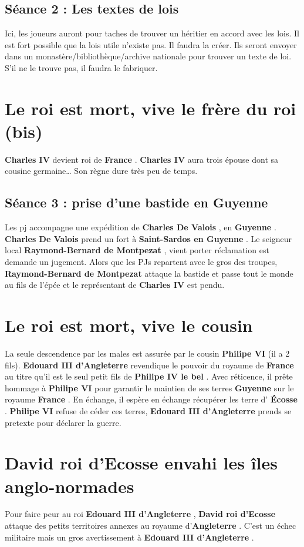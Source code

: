 \documentclass[oneside,12pt]{book}
\newcommand{\Guyenne}{\textbf{Guyenne} }%
\newcommand{\France}{\textbf{France} }
\newcommand{\Angleterre}{\textbf{Angleterre} }
\newcommand{\Ecosse}{\textbf{Écosse} }
\newcommand{\SaintSardos}{\textbf{Saint-Sardos en Guyenne} }
\newcommand{\PhilipeIVLeBel}{\textbf{Philipe IV le bel} }%
\newcommand{\CharlesIV}{\textbf{Charles IV} }%
\newcommand{\CharlesDeValois}{\textbf{Charles De Valois} }%
\newcommand{\PhilipeVI}{\textbf{Philipe VI} }%
\newcommand{\EdouardIII}{\textbf{Edouard III d'Angleterre} }%
\newcommand{\ducGuyenne}{\textbf{Raymond-Bernard de Montpezat} }
\newcommand{\RoiEcosse}{\textbf{David roi d'Ecosse} }
\begin{document}
\begin{flushleft}
\subsection{Séance 2 : Les textes de lois}
Ici, les joueurs auront pour taches de trouver un héritier en accord avec les lois. Il est fort possible que la lois utile n'existe pas. 
Il faudra la créer. Ils seront envoyer dans un monastère/bibliothèque/archive nationale pour trouver un texte de loi. 
S'il ne le trouve pas, il faudra le fabriquer.


\section{Le roi est mort, vive le frère du roi (bis)}
\CharlesIV devient roi de \France.
\CharlesIV aura trois épouse dont sa cousine germaine…
Son règne dure très peu de temps. 

\subsection{Séance 3 : prise d'une bastide en \Guyenne}
Les pj accompagne une expédition de \CharlesDeValois, en \Guyenne. \CharlesDeValois prend un fort à \SaintSardos.
Le seigneur local \ducGuyenne, vient porter réclamation est demande un jugement. 
Alors que les PJs repartent avec le gros des troupes, 
\ducGuyenne attaque la bastide et passe tout le monde au fils de l'épée et le représentant de \CharlesIV est pendu.


\section{Le roi est mort, vive le cousin}
La seule descendence par les males est assurée par le cousin \PhilipeVI (il a 2 fils).
\EdouardIII revendique le pouvoir du royaume de \France au titre qu'il est le seul petit fils de \PhilipeIVLeBel. 
Avec réticence, il prête hommage à \PhilipeVI pour garantir le maintien de ses terres \Guyenne sur le royaume \France. 
En échange, il espère en échange récupérer les terre d' \Ecosse. 
\PhilipeVI refuse de céder ces terres, \EdouardIII prends se pretexte pour déclarer la guerre. 


\section{\RoiEcosse envahi les îles anglo-normades}
    Pour faire peur au roi \EdouardIII, \RoiEcosse attaque des petits territoires annexes au royaume d'\Angleterre. C'est un échec militaire mais un gros avertissement à \EdouardIII. 
 

\end{flushleft}
\end{document}
